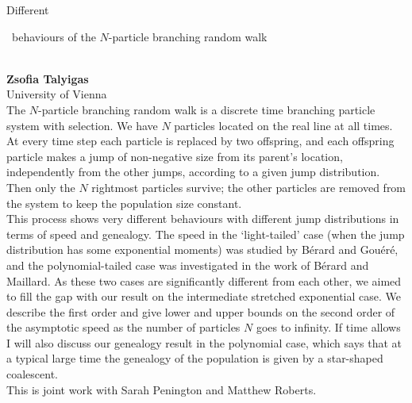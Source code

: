 \documentclass[12pt,a4paper]{article}
\newcommand{\ZAbst}{\rule[-1ex]{0pt}{2ex}\ } %
\begin{document}
\noindent
{\Large Different\ZAbst behaviours of the $N$-particle branching random walk}\\[1ex]
{\large 
\textbf{Zsofia Talyigas}\\[1ex] University of Vienna}\\[2ex]
The $N$-particle branching random walk is a discrete time branching particle system with selection. We have $N$ particles located on the real line at all times. At every time step each particle is replaced by two offspring, and each offspring particle makes a jump of non-negative size from its parent's location, independently from the other jumps, according to a given jump distribution. Then only the $N$ rightmost particles survive; the other particles are removed from the system to keep the population size constant.
\\
This process shows very different behaviours with different jump distributions in terms of speed and genealogy. The speed in the ‘light-tailed’ case (when the jump distribution has some exponential moments) was studied by B\'erard and Gou\'er\'e, and the polynomial-tailed case was investigated in the work of B\'erard and Maillard. As these two cases are significantly different from each other, we aimed to fill the gap with our result on the intermediate stretched exponential case. We describe the first order and give lower and upper bounds on the second order of the asymptotic speed as the number of particles $N$ goes to infinity. If time allows I will also discuss our genealogy result in the polynomial case, which says that at a typical large time the genealogy of the population is given by a star-shaped coalescent.
\\
This is joint work with Sarah Penington and Matthew Roberts. 

\bigskip \bigskip  %
\end{document}
